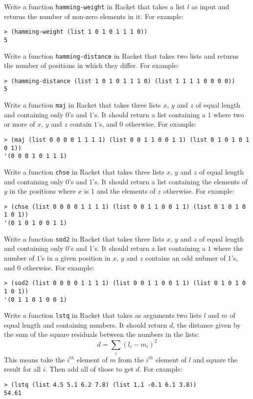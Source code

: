 \documentclass[a4paper, 12pt]{exam}
\begin{document}
\begin{questions}
\question
Write a function \texttt{hamming-weight} in Racket that takes a list $l$ as input and returns the number of non-zero elements in it.
For example:
\begin{verbatim}
> (hamming-weight (list 1 0 1 0 1 1 1 0))
5
\end{verbatim}

\question
Write a function \texttt{hamming-distance} in Racket that takes two lists and returns the number of positions in which they differ.
For example:
\begin{verbatim}
> (hamming-distance (list 1 0 1 0 1 1 1 0) (list 1 1 1 1 0 0 0 0))
5
\end{verbatim}

\question
Write a function \texttt{maj} in Racket that takes three lists $x$, $y$ and $z$ of equal length and containing only 0's and 1's.
It should return a list containing a $1$ where two or more of $x$, $y$ and $z$ contain $1$'s, and $0$ otherwise.
For example:
\begin{verbatim}
> (maj (list 0 0 0 0 1 1 1 1) (list 0 0 1 1 0 0 1 1) (list 0 1 0 1 0 1 0 1))
'(0 0 0 1 0 1 1 1)
\end{verbatim}

\question
Write a function \texttt{chse} in Racket that takes three lists $x$, $y$ and $z$ of equal length and containing only 0's and 1's.
It should return a list containing the elements of $y$ in the positions where $x$ is $1$ and the elements of $z$ otherwise.
For example:
\begin{verbatim}
> (chse (list 0 0 0 0 1 1 1 1) (list 0 0 1 1 0 0 1 1) (list 0 1 0 1 0 1 0 1))
'(0 1 0 1 0 0 1 1)
\end{verbatim}

\question
Write a function \texttt{sod2} in Racket that takes three lists $x$, $y$ and $z$ of equal length and containing only 0's and 1's.
It should return a list containing a $1$ where the number of $1$'s in a given position in $x$, $y$ and $z$ contains an odd nubmer of $1$'s, and $0$ otherwise.
For example:
\begin{verbatim}
> (sod2 (list 0 0 0 0 1 1 1 1) (list 0 0 1 1 0 0 1 1) (list 0 1 0 1 0 1 0 1))
'(0 1 1 0 1 0 0 1)
\end{verbatim}

\question
Write a function \texttt{lstq} in Racket that takes as arguments two lists $l$ and $m$ of equal length and containing numbers.
It should return $d$, the distance given by the sum of the square residuals between the numbers in the lists:
\[ d = \sum_i (l_i - m_i)^2 \]
This means take the $i^{th}$ element of $m$ from the $i^{th}$ element of $l$ and square the result for all $i$.
Then add all of those to get $d$.
For example:
\begin{verbatim}
> (lstq (list 4.5 5.1 6.2 7.8) (list 1.1 -0.1 6.1 3.8))
54.61
\end{verbatim}



\end{questions}



\end{document}

